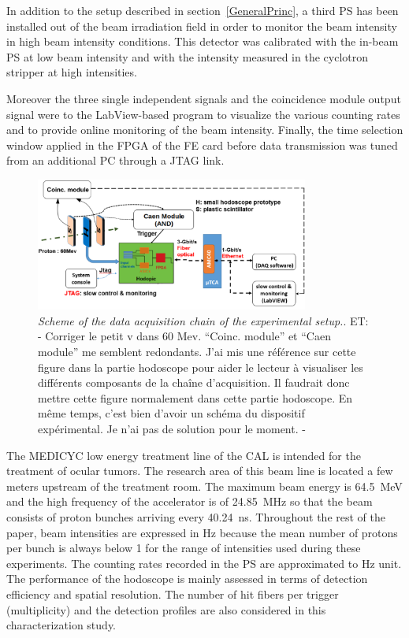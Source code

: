 \documentclass[a4paper,11pt]{article}
\newcommand\et[1]{\color{etcolor}ET: - #1 - \color{black}}
\begin{document}
In addition to the setup described in section~\ref{GeneralPrinc}, a third PS has been installed out of the beam irradiation field in order to monitor the beam intensity in high beam intensity conditions. This detector was calibrated with the in-beam PS at low beam intensity and with the intensity measured in the cyclotron stripper at high intensities. 

Moreover the three single independent signals and the coincidence module output signal were to the LabView-based program to visualize the various counting rates and to provide online monitoring of the beam intensity. 
Finally, the time selection window applied in the FPGA of the FE card before data transmission was tuned from an additional PC through a JTAG link.

\begin{figure}[htb]
\centering
\includegraphics[width=0.8\textwidth]{figures/Scheme_Setup_Nice_08_2019.pdf}
\caption{\small{\textit{Scheme of the data acquisition chain of the experimental setup.}}. \et{Corriger le petit v dans 60 Mev. \enquote{Coinc. module} et \enquote{Caen module} me semblent redondants. J'ai mis une référence sur cette figure dans la partie hodoscope pour aider le lecteur à visualiser les différents composants de la chaîne d'acquisition. Il faudrait donc mettre cette figure normalement dans cette partie hodoscope. En même temps, c'est bien d'avoir un schéma du dispositif expérimental. Je n'ai pas de solution pour le moment.}}
\label{fig:Scheme_Setup_hodo}
\end{figure}

The MEDICYC low energy treatment line of the CAL is intended for the treatment of ocular tumors. The research area of this beam line is located a few meters upstream of the treatment room. The maximum beam energy is 64.5~MeV and the high frequency of the accelerator is of 24.85~MHz so that the beam consists of proton bunches arriving every 40.24~ns. Throughout the rest of the paper, beam intensities are expressed in Hz because the mean number of protons per bunch is always below 1 for the range of intensities used during these experiments. The counting rates recorded in the PS are approximated to Hz unit.
The performance of the hodoscope is mainly assessed in terms of detection efficiency and spatial resolution. The number of hit fibers per trigger (multiplicity) and the detection profiles are also considered in this characterization study.
\end{document}
